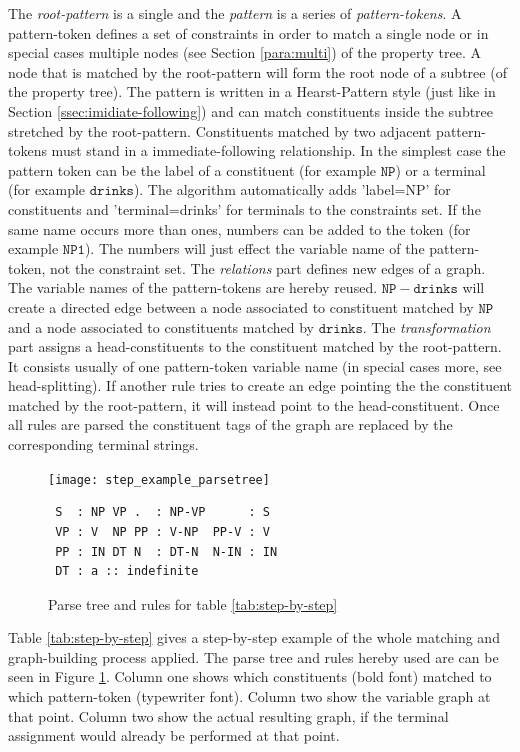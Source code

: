 \documentclass[english]{article}
\begin{document}
The \textit{root-pattern} is a single and the \textit{pattern} is a series of \textit{pattern-tokens}. A pattern-token defines a set of constraints in order to match a single node or in special cases multiple nodes (see Section \ref{para:multi}) of the property tree.
A node that is matched by the root-pattern will form the root node of a subtree (of the property tree). The pattern is written in a Hearst-Pattern style (just like in Section \ref{ssec:imidiate-following}) and can match constituents inside the subtree stretched by the root-pattern. Constituents matched by two adjacent pattern-tokens must stand in a immediate-following relationship. In the simplest case the pattern token can  be the label of a constituent (for example $\mathtt{NP}$) or a terminal (for example $\mathtt{drinks}$). The algorithm automatically adds 'label=NP' for constituents and 'terminal=drinks' for terminals to the constraints set. If the same name occurs more than ones, numbers can be added to the token (for example $\mathtt{NP1}$). The numbers will just effect the variable name of the pattern-token, not the constraint set.  
The \textit{relations} part defines new edges of a graph. The variable names of the pattern-tokens are hereby reused. $\mathtt{NP-drinks}$ will create a directed edge between a node associated to constituent matched by $\mathtt{NP}$ and a node associated to constituents matched by $\mathtt{drinks}$.
The \textit{transformation} part assigns a head-constituents to the constituent matched by the root-pattern. It consists usually of one pattern-token variable name (in special cases more, see head-splitting). If another rule tries to create an edge pointing the the constituent matched by the root-pattern, it will instead point to the head-constituent.
Once all rules are parsed the constituent tags of the graph are replaced by the corresponding terminal strings.
\begin{figure}
\centering
\texttt{[image: step\_example\_parsetree]}
\lstset{
  numbers=left,
  frame=tb,
  xleftmargin=.15\textwidth, xrightmargin=.15\textwidth
} 
\begin{lstlisting}
 S  : NP VP .  : NP-VP      : S
 VP : V  NP PP : V-NP  PP-V : V
 PP : IN DT N  : DT-N  N-IN : IN 
 DT : a :: indefinite
\end{lstlisting}
\caption{Parse tree and rules for table \ref{tab:step-by-step}}
\label{fig:step-by-step}
\end{figure}
Table \ref{tab:step-by-step} gives a step-by-step example of the whole matching and graph-building process applied. The parse tree and rules hereby used are can be seen in Figure \ref{fig:step-by-step}. Column one shows which constituents (bold font) matched to which pattern-token (typewriter font). Column two show the variable graph at that point. Column two show the actual resulting graph, if the terminal assignment would already be performed at that point.
\end{document}
